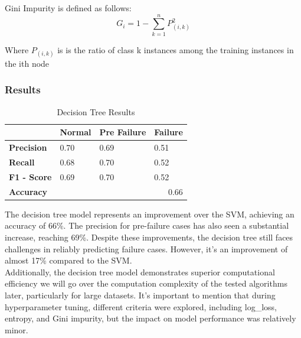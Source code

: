 \documentclass{article}
\begin{document}
Gini Impurity is defined as follows:
\begin{equation}
    G_i = 1 - \sum_{k = 1}^{n}{P_{(i,k)}^2}
\end{equation}

Where $P_{(i,k)}$ is  is the ratio of class k instances among the training instances in the ith node

\subsubsection{Results}

\begin{table}[htbp]
\centering
\caption{Decision Tree Results}
\begin{tabular}{|l|lll|}
\hline
                    & \multicolumn{1}{l|}{\textbf{Normal}} & \multicolumn{1}{l|}{\textbf{Pre Failure}} & \textbf{Failure} \\ \hline
\textbf{Precision}  & \multicolumn{1}{l|}{0.70}            & \multicolumn{1}{l|}{0.69}                 & 0.51             \\ \hline
\textbf{Recall}     & \multicolumn{1}{l|}{0.68}            & \multicolumn{1}{l|}{0.70}                 & 0.52             \\ \hline
\textbf{F1 - Score} & \multicolumn{1}{l|}{0.69}            & \multicolumn{1}{l|}{0.70}                 & 0.52             \\ \hline
\textbf{Accuracy}   & \multicolumn{3}{r|}{0.66}                                                                           \\ \hline
\end{tabular}
\end{table}

The decision tree model represents an improvement over the SVM, achieving an accuracy of 66\%. The precision for pre-failure cases has also seen a substantial increase, reaching 69\%. Despite these improvements, the decision tree still faces challenges in reliably predicting failure cases. However, it's an improvement of almost 17\% compared to the SVM. \\

Additionally, the decision tree model demonstrates superior computational efficiency we will go over the computation complexity of the tested algorithms later, particularly for large datasets. It's important to mention that during hyperparameter tuning, different criteria were explored, including log\_loss, entropy, and Gini impurity, but the impact on model performance was relatively minor.\\
\end{document}
